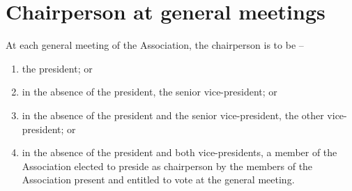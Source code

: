 \section{Chairperson at general meetings}
\label{rule:chair}

At each general meeting of the Association, the chairperson is to be --
\begin{enumerate}
	\item the president; or
	\item in the absence of the president, the senior vice-president; or
	\item in the absence of the president and the senior vice-president, the other vice-president; or
	\item in the absence of the president and both vice-presidents, a member of the Association elected to preside as chairperson by the members of the Association present and entitled to vote at the general meeting.
\end{enumerate}
